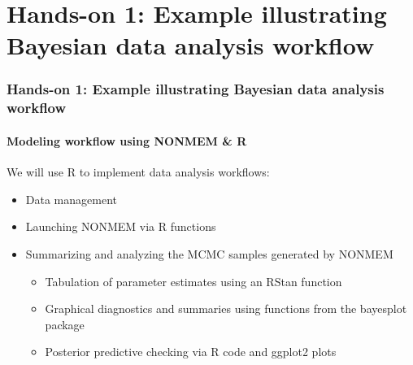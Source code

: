 \documentclass{beamer}
\begin{document}
\section{Hands-on 1: Example illustrating Bayesian data analysis workflow}

\begin{frame}
  \frametitle{Hands-on 1: Example illustrating Bayesian data analysis workflow}
  \framesubtitle{Modeling workflow using NONMEM \& R}
  
We will use R to implement data analysis workflows:
\begin{itemize}
\item Data management
\item Launching NONMEM via R functions
\item Summarizing and analyzing the MCMC samples generated by NONMEM
  \begin{itemize}
  \item Tabulation of parameter estimates using an RStan function
\item Graphical diagnostics and summaries using functions from the bayesplot package
\item Posterior predictive checking via R code and ggplot2 plots
  \end{itemize}
\end{itemize}

\end{frame}

\end{document}
